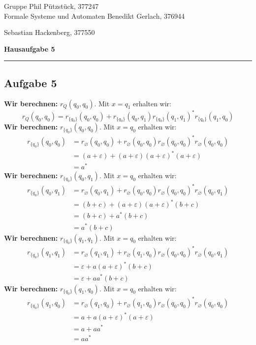 \documentclass[a4paper,graphics,11pt]{article}
\newcommand{\aufgabe}[1]{\subsection*{Aufgabe #1}}
\begin{document}
\noindent Gruppe              \hfill Phil Pützstück, 377247\\
\noindent Formale Systeme und Automaten \hfill Benedikt Gerlach, 376944\\
\strut\hfill Sebastian Hackenberg, 377550\\
\begin{center}
	\LARGE{\textbf{Hausaufgabe 5}}
\end{center}
\begin{center}
\rule[0.1ex]{\textwidth}{1pt}
\end{center}

\aufgabe{5}
\textbf{Wir berechnen:} $r_Q(q_0, q_0)$. Mit $x = q_1$ erhalten wir:
$$
    r_Q(q_0, q_0) =
    r_{\{q_0\}}(q_0, q_0)
    + r_{\{q_0\}}(q_0, q_1)r_{\{q_0\}}(q_1, q_1)^*r_{\{q_0\}}(q_1, q_0)
$$
\textbf{Wir berechnen:} $r_{\{q_0\}}(q_0, q_0)$. Mit $x = q_0$ erhalten wir:
\begin{align*}
    r_{\{q_0\}}(q_0, q_0) &=
    r_{\varnothing}(q_0, q_0)
    + r_{\varnothing}(q_0, q_0)r_{\varnothing}(q_0, q_0)^*r_{\varnothing}(q_0, q_0)\\
    &= (a+\varepsilon) + (a+\varepsilon)(a+\varepsilon)^*(a+\varepsilon)\\
    &= a^*
\end{align*}
\textbf{Wir berechnen:} $r_{\{q_0\}}(q_0, q_1)$. Mit $x = q_0$ erhalten wir:
\begin{align*}
    r_{\{q_0\}}(q_0, q_1)
    &= r_{\varnothing}(q_0, q_1)
    + r_{\varnothing}(q_0, q_0)r_{\varnothing}(q_0, q_0)^*r_{\varnothing}(q_0, q_1)\\
    &= (b+c) + (a+\varepsilon)(a+\varepsilon)^*(b+c)\\
    &= (b+c) + a^*(b+c)\\
    &= a^*(b+c)
\end{align*}
\textbf{Wir berechnen:} $r_{\{q_0\}}(q_1, q_1)$. Mit $x = q_0$ erhalten wir:
\begin{align*}
    r_{\{q_0\}}(q_1, q_1) &=
    r_{\varnothing}(q_1, q_1)
    + r_{\varnothing}(q_1, q_0)r_{\varnothing}(q_0, q_0)^*r_{\varnothing}(q_0, q_1)\\
    &= \varepsilon + a(a+\varepsilon)^*(b+c)\\
    &= \varepsilon + aa^*(b+c)
\end{align*}
\textbf{Wir berechnen:} $r_{\{q_0\}}(q_1, q_0)$. Mit $x = q_0$ erhalten wir:
\begin{align*}
    r_{\{q_0\}}(q_1, q_0) &=
    r_{\varnothing}(q_1, q_0)
    + r_{\varnothing}(q_1, q_0)r_{\varnothing}(q_0, q_0)^*r_{\varnothing}(q_0, q_0)\\
    &= a + a(a + \varepsilon)^*(a + \varepsilon)\\
    &= a + aa^*\\
    &= aa^*
\end{align*}
\end{document}
